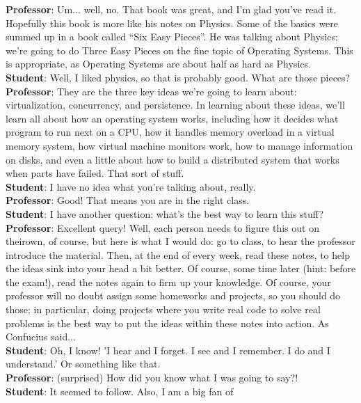 \noindent\textbf{Professor}: Um... well, no. That book was great, and I’m glad
you’ve read it. Hopefully this book is more like his notes on Physics. Some of
the basics were summed up in a book called “Six Easy Pieces”. He was talking
about Physics; we’re going to do Three Easy Pieces on the fine topic of
Operating Systems. This is appropriate, as Operating Systems are about half as
hard as Physics. \\
\noindent\textbf{Student}: Well, I liked physics, so that is probably good. What
are those pieces? \\
\noindent\textbf{Professor}: They are the three key ideas we’re going to learn
about: virtualization, concurrency, and persistence. In learning about these
ideas, we’ll learn all about how an operating system works, including how it
decides what program to run next on a CPU, how it handles memory overload in a
virtual memory system, how virtual machine monitors work, how to manage
information on disks, and even a little about how to build a distributed system
that works when parts have failed. That sort of stuff. \\
\noindent\textbf{Student}: I have no idea what you’re talking about, really. \\
\noindent\textbf{Professor}: Good! That means you are in the right class. \\
\noindent\textbf{Student}: I have another question: what’s the best way to
learn this stuff? \\
\noindent\textbf{Professor}: Excellent query! Well, each person needs to figure
this out on theirown, of course, but here is what I would do: go to class, to
hear the professor introduce the material. Then, at the end of every week, read
these notes, to help the ideas sink into your head a bit better. Of course, some
time later (hint: before the exam!), read the notes again to firm up your
knowledge. Of course, your professor will no doubt assign some homeworks and
projects, so you should do those; in particular, doing projects where you write
real code to solve real problems is the best way to put the ideas within these
notes into action. As Confucius said... \\
\noindent\textbf{Student}: Oh, I know! ’I hear and I forget. I see and I
remember. I do and I understand.’ Or something like that. \\
\noindent\textbf{Professor}: (surprised) How did you know what I was going to
say?! \\
\noindent\textbf{Student}: It seemed to follow. Also, I am a big fan of
